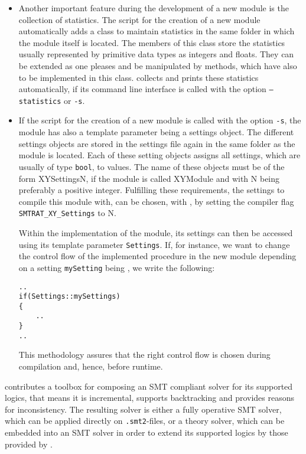 \begin{itemize}
\item Another important feature during the development of a new module is the collection of statistics. The script \writeModule for the creation of a new module automatically adds a class to maintain statistics in the same folder in which the module itself is located. The members of this class store the statistics usually represented by primitive data types as integers and floats. They can be extended as one pleases and be manipulated by methods, which have also to be implemented in this class. \smtrat collects and prints these statistics automatically, if its command line interface is called with the option \texttt{--statistics} or \texttt{-s}.

\item If the script \writeModule for the creation of a new module is called with the option \texttt{-s}, the module has also a template parameter being a settings object. The different settings objects are stored in the settings file again in the same folder as the module is located. Each of these setting objects assigns all settings, which are usually of type \texttt{bool}, to values. The name of these objects must be of the form XYSettingsN, if the module is called XYModule and with N being preferably a positive integer. Fulfilling these requirements, the settings to compile this module with, can be chosen, \eg with \ccmake, by setting the compiler flag \texttt{SMTRAT\_XY\_Settings} to N. 

Within the implementation of the module, its settings can then be accessed using its template parameter \texttt{Settings}. If, for instance, we want to change the control flow of the implemented procedure in the new module depending on a setting \texttt{mySetting} being \true, we write the following:
\begin{verbatim}
..
if(Settings::mySettings)
{
    ..
}
..
\end{verbatim}
This methodology assures that the right control flow is chosen during compilation and, hence,  before runtime. 
\end{itemize}

\smtrat contributes a toolbox for composing an SMT compliant solver for its supported logics, that means it is incremental, supports backtracking and provides reasons for inconsistency. The resulting
solver is either a fully operative SMT solver, which can be applied
directly on \texttt{.smt2}-files, or a theory solver, which can be embedded into an SMT 
solver in order to extend its supported logics by those provided by \smtrat.

